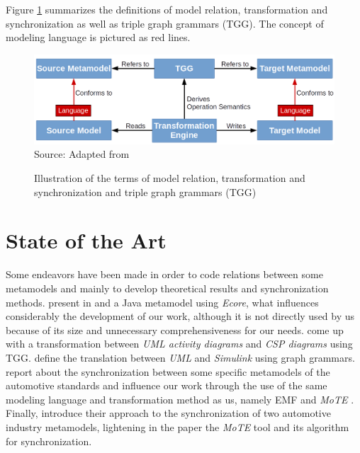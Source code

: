 \documentclass[tuberlin,cic,tc,english,noabntcite, oneside]{iiufrgs}
\begin{document}
	Figure \ref{fig:transformation_scheme} summarizes the definitions of model relation, transformation and synchronization as well as triple graph grammars (TGG). The concept of modeling language is pictured as red lines.
	\begin{figure}[H]
		\centering
	    \caption{Illustration of the terms of model relation, transformation and synchronization and triple graph grammars (TGG)}
	    \includegraphics[width=.7\textwidth]{transformation_scheme} \\
	    Source: Adapted from \citet[p. 623]{czarnecki2006feature}
	    \label{fig:transformation_scheme}
	\end{figure}

\chapter{State of the Art}
Some endeavors have been made in order to code relations between some metamodels and mainly to develop theoretical results and synchronization methods. \citeauthor{heidenreich2010closing} present in \citeyearpar{heidenreich2009jamopp} and \citeyearpar{heidenreich2010closing} a Java metamodel using \emph{Ecore}, what influences considerably the development of our work, although it is not directly used by us because of its size and unnecessary comprehensiveness for our needs. \citet{greenyer2008tggs} come up with a transformation between \emph{UML activity diagrams} and \emph{CSP diagrams} using TGG. \citet{foss2011uml} define the translation between \emph{UML} and \emph{Simulink} using graph grammars. \citet{blouin2014synchronization} report about the synchronization between some specific metamodels of the automotive standards and influence our work through the use of the same modeling language and transformation method as us, namely EMF \citep{steinberg2008emf} and \emph{MoTE} \citep{giese2010toward}. Finally, \citet{giese2010model} introduce their approach to the synchronization of two automotive industry metamodels, lightening in the paper the \emph{MoTE} tool and its algorithm for synchronization.
\end{document}
